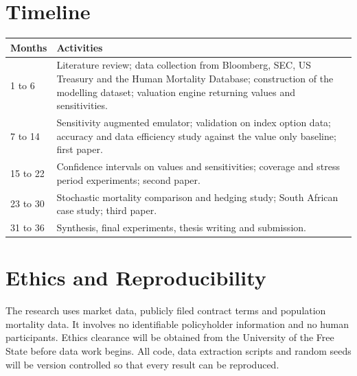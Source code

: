 \documentclass[12pt,a4paper]{article}
\begin{document}
\section{Timeline}
\begin{longtable}{p{2.6cm}p{11.2cm}}
\toprule
\textbf{Months} & \textbf{Activities} \\
\midrule
1 to 6   & Literature review; data collection from Bloomberg, SEC, US Treasury and the Human Mortality Database; construction of the modelling dataset; valuation engine returning values and sensitivities. \\
7 to 14  & Sensitivity augmented emulator; validation on index option data; accuracy and data efficiency study against the value only baseline; first paper. \\
15 to 22 & Confidence intervals on values and sensitivities; coverage and stress period experiments; second paper. \\
23 to 30 & Stochastic mortality comparison and hedging study; South African case study; third paper. \\
31 to 36 & Synthesis, final experiments, thesis writing and submission. \\
\bottomrule
\end{longtable}

\section{Ethics and Reproducibility}
The research uses market data, publicly filed contract terms and population mortality data. It involves no identifiable policyholder information and no human participants. Ethics clearance will be obtained from the University of the Free State before data work begins. All code, data extraction scripts and random seeds will be version controlled so that every result can be reproduced.

\clearpage
{}
{}


\end{document}
